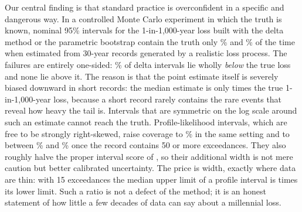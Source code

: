 Our central finding is that standard practice is overconfident in a specific and dangerous way. In a controlled Monte Carlo experiment in which the truth is known, nominal 95\% intervals for the 1-in-1,000-year loss built with the delta method or the parametric bootstrap contain the truth only \covBThirtyDeltaK\% and \covBThirtyBootstrapK\% of the time when estimated from 30-year records generated by a realistic loss process. The failures are entirely one-sided: \belowBThirtyDeltaK\% of delta intervals lie wholly \emph{below} the true loss and none lie above it. The reason is that the point estimate itself is severely biased downward in short records: the median estimate is only \medRatioBThirtyK{} times the true 1-in-1,000-year loss, because a short record rarely contains the rare events that reveal how heavy the tail is. Intervals that are symmetric on the log scale around such an estimate cannot reach the truth. Profile-likelihood intervals, which are free to be strongly right-skewed, raise coverage to \covBThirtyProfileK\% in the same setting and to between \covAHundredProfileK\% and \covAThreeHundredProfileK\% once the record contains 50 or more exceedances. They also roughly halve the proper interval score of \citet{gneiting2007}, so their additional width is not mere caution but better calibrated uncertainty. The price is width, exactly where data are thin: with 15 exceedances the median upper limit of a profile interval is \ratioAThirtyProfileK{} times its lower limit. Such a ratio is not a defect of the method; it is an honest statement of how little a few decades of data can say about a millennial loss.

